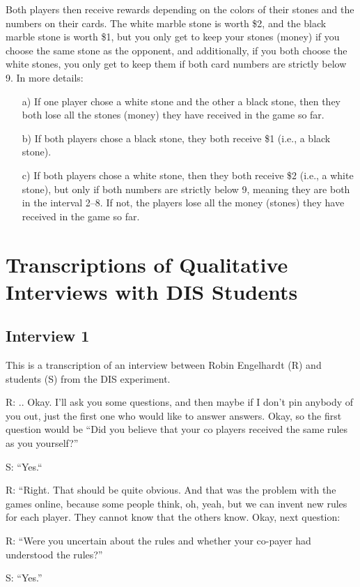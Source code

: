 \documentclass[a4paper,superscriptaddress,nofootinbib]{revtex4}
\begin{document}
Both players then receive rewards depending on the colors of their stones and the numbers on their cards. The white marble stone is worth \$2, and the black marble stone is worth \$1, but you only get to keep your stones (money) if you choose the same stone as the opponent, and additionally, if you both choose the white stones, you only get to keep them if both card numbers are strictly below 9. In more details:  
\begin{enumerate}
\item[a)] If one player chose a white stone and the other a black stone, then they both lose all the stones (money) they have received in the game so far.
\item[b)] If both players chose a black stone, they both receive \$1 (i.e., a black stone).
\item[c)] If both players chose a white stone, then they both receive \$2 (i.e., a white stone), but only if both numbers are strictly below 9, meaning they are both in the interval 2--8. If not, the players lose all the money (stones) they have received in the game so far.
\end{enumerate} 

\section*{Transcriptions of Qualitative Interviews with DIS Students}


\subsection*{Interview 1}
This is a transcription of an interview between Robin Engelhardt (R) and students (S) from the DIS experiment.


\medskip
R: .. Okay. I'll ask you some questions, and then maybe if I don't pin anybody of you out, just the first one who would like to answer answers. Okay, so the first question would be 
“Did you believe that your co players received the same rules as you yourself?” 

S: “Yes.“

R: “Right. That should be quite obvious. And that was the problem with the games online, because some people think, oh, yeah, but we can invent new rules for each player. They cannot know that the others know. Okay, next question:

R: “Were you uncertain about the rules and whether your co-payer had understood the rules?” 

S: “Yes.”
\end{document}
